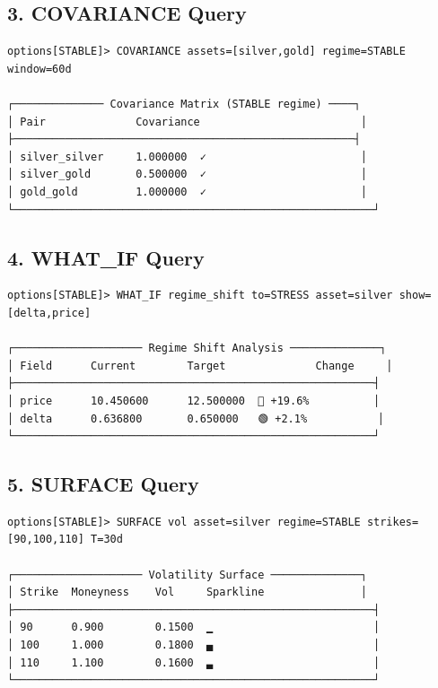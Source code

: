 \documentclass[12pt,oneside,openany]{book}
\begin{document}
\subsection{3. COVARIANCE Query}

\begin{lstlisting}
options[STABLE]> COVARIANCE assets=[silver,gold] regime=STABLE window=60d

┌────────────── Covariance Matrix (STABLE regime) ────┐
│ Pair              Covariance                         │
├─────────────────────────────────────────────────────┤
│ silver_silver     1.000000  ✓                        │
│ silver_gold       0.500000  ✓                        │
│ gold_gold         1.000000  ✓                        │
└────────────────────────────────────────────────────────┘
\end{lstlisting}

\subsection{4. WHAT\_IF Query}

\begin{lstlisting}
options[STABLE]> WHAT_IF regime_shift to=STRESS asset=silver show=[delta,price]

┌──────────────────── Regime Shift Analysis ──────────────┐
│ Field      Current        Target              Change     │
├────────────────────────────────────────────────────────┤
│ price      10.450600      12.500000  🔴 +19.6%          │
│ delta      0.636800       0.650000   🟢 +2.1%           │
└────────────────────────────────────────────────────────┘
\end{lstlisting}

\subsection{5. SURFACE Query}

\begin{lstlisting}
options[STABLE]> SURFACE vol asset=silver regime=STABLE strikes=[90,100,110] T=30d

┌──────────────────── Volatility Surface ──────────────┐
│ Strike  Moneyness    Vol     Sparkline               │
├────────────────────────────────────────────────────────┤
│ 90      0.900        0.1500  ▁                         │
│ 100     1.000        0.1800  ▄                         │
│ 110     1.100        0.1600  ▃                         │
└────────────────────────────────────────────────────────┘
\end{lstlisting}
\end{document}
